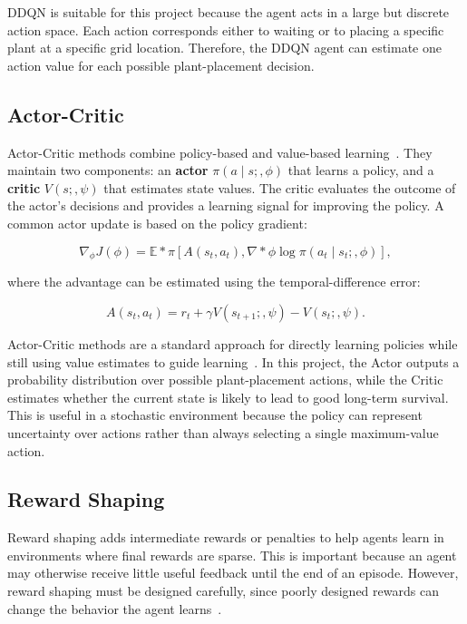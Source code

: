 \documentclass[conference,onecolumn]{IEEEtran}
\begin{document}
DDQN is suitable for this project because the agent acts in a large but discrete action space. Each action corresponds either to waiting or to placing a specific plant at a specific grid location. Therefore, the DDQN agent can estimate one action value for each possible plant-placement decision.

\subsection{Actor-Critic}

Actor-Critic methods combine policy-based and value-based learning~\cite{sutton1998reinforcement}. They maintain two components: an \textbf{actor} $\pi(a \mid s;,\phi)$ that learns a policy, and a \textbf{critic} $V(s;,\psi)$ that estimates state values. The critic evaluates the outcome of the actor's decisions and provides a learning signal for improving the policy. A common actor update is based on the policy gradient:

\begin{equation}
\nabla_\phi J(\phi) = \mathbb{E}*\pi \left[ A(s_t, a_t), \nabla*\phi \log \pi(a_t \mid s_t;, \phi) \right],
\end{equation}

where the advantage can be estimated using the temporal-difference error:

\begin{equation}
A(s_t, a_t) = r_t + \gamma V(s_{t+1};,\psi) - V(s_t;,\psi).
\end{equation}

Actor-Critic methods are a standard approach for directly learning policies while still using value estimates to guide learning~\cite{konda2003actor}. In this project, the Actor outputs a probability distribution over possible plant-placement actions, while the Critic estimates whether the current state is likely to lead to good long-term survival. This is useful in a stochastic environment because the policy can represent uncertainty over actions rather than always selecting a single maximum-value action.

\subsection{Reward Shaping}

Reward shaping adds intermediate rewards or penalties to help agents learn in environments where final rewards are sparse. This is important because an agent may otherwise receive little useful feedback until the end of an episode. However, reward shaping must be designed carefully, since poorly designed rewards can change the behavior the agent learns~\cite{ng1999policy}.
\end{document}
